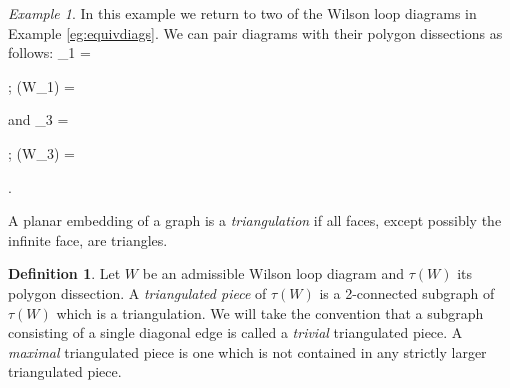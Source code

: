 \documentclass[11pt]{article}
\newcommand{\drawWLD}[2]{

\pgfmathsetmacro{\n}{#1}
\pgfmathsetmacro{\radius}{#2}
\pgfmathsetmacro{\angle}{360/\n}
\draw (0,0) circle (\radius);
    \foreach \i in {1,2,...,\n} {
      \draw (\angle*\i:\radius) node {$\bullet$};
    }

}
\newcommand{\drawpolypart}[2]{
\pgfmathsetmacro{\n}{#1}
\pgfmathsetmacro{\radius}{#2}
\pgfmathsetmacro{\angle}{360/\n}
    \foreach \i in {1,2,...,\n} {
      \draw (\angle*\i+ \angle/2:\radius) node {$\bullet$};
     \pgfmathsetmacro{\x}{\angle*\i - \angle/2}
      \pgfmathsetmacro{\concave}{((\n-1.5)/\n)}
      \draw (\x:\radius cm) .. controls (\angle *\i: \concave* \radius cm) .. (\x + \angle:\radius cm);
    }

}
\newcommand{\drawprop}[4]{
\pgfmathsetmacro{\r}{#1}
\pgfmathsetmacro{\bumpr}{#2}
\pgfmathsetmacro{\s}{#3}
\pgfmathsetmacro{\bumps}{#4}
\pgfmathsetmacro{\perturbe}{\angle/\n}

\begin{scope}
\draw[propagator] (\angle*\r + \angle/2 + \bumpr*\perturbe:\radius) -- (\angle*\s + \angle/2 + \bumps*\perturbe:\radius);
\end{scope}
}
\newcommand{\drawchord}[2]{
\pgfmathsetmacro{\r}{#1}
\pgfmathsetmacro{\s}{#2}

\begin{scope}
\draw (\angle*\r + \angle/2:\radius) -- (\angle*\s + \angle/2:\radius);
\end{scope}
}
\newcommand{\drawnumbers}{
  \foreach \i in {1,2,...,\n} {
  \pgfmathsetmacro{\x}{\angle*\i}
  \draw (\x:\radius*1.15) node {\footnotesize \i};
}
}
\newcommand{\drawnumbersshift}{
  \foreach \i in {1,2,...,\n} {
  \pgfmathsetmacro{\x}{\angle*\i + \angle/2}
  \draw (\x:\radius*1.15) node {\footnotesize \i};
}
}
\def\bas #1\eas{\begin{align*} #1 \end{align*}}
\theoremstyle{remark}
\newtheorem{eg}[thm]{Example}
\theoremstyle{definition}
\newtheorem{dfn}[thm]{Definition}
\begin{document}
\begin{eg}\label{WLDtopolygonpartition}
In this example we return to two of the Wilson loop diagrams in Example \ref{eg:equivdiags}. We can pair diagrams with their polygon dissections as follows:
\bas W_1 =  \quad; \quad
\tau(W_1) = 
\eas and
\bas W_3 = \quad; \quad
\tau(W_3) =  .
\eas

\end{eg}

A planar embedding of a graph is a \emph{triangulation} if all faces, except possibly the infinite face, are triangles.

\begin{dfn}
  Let $W$ be an admissible Wilson loop diagram and $\tau(W)$ its polygon dissection. A \emph{triangulated piece} of $\tau(W)$ is a 2-connected subgraph of $\tau(W)$ which is a triangulation. We will take the convention that a subgraph consisting of a single diagonal edge is called a \emph{trivial} triangulated piece.
A {\em maximal} triangulated piece is one which is not contained in any strictly larger triangulated piece.
\end{dfn}
\end{document}
